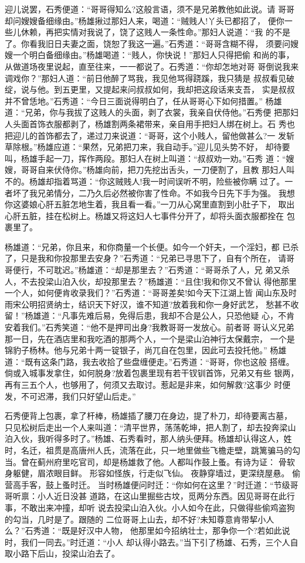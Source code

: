 迎儿说罢，石秀便道：“哥哥得知么?这般言语，须不是兄弟教他如此说。请
哥哥却问嫂嫂备细缘由。”杨雄揪过那妇人来，喝道：“贼贱人!丫头已都招了，
便你一些儿休赖，再把实情对我说了，饶了这贱人一条性命。”那妇人说道：“我
的不是了。你看我旧日夫妻之面，饶恕了我这一遍。”石秀道：“哥哥含糊不得，
须要问嫂嫂一个明白备细缘由。”杨雄喝道：“贱人，你快说！”那妇人只得把偷
和尚的事，从做道场夜里说起，直至往来，一一都说了。石秀道：“你却怎地对哥
哥倒说我来调戏你？”那妇人道：“前日他醉了骂我，我见他骂得跷蹊，我只猜是
叔叔看见破绽，说与他。到五更里，又提起来问叔叔如何，我却把这段话来支吾，
实是叔叔并不曾恁地。”石秀道：“今日三面说得明白了，任从哥哥心下如何措置。”
杨雄道：“兄弟，你与我拔了这贱人的头面，剥了衣裳，我亲自伏侍他。”石秀便
把那妇人头面首饰衣服都剥了，杨雄割两条裙带来，亲自用手把妇人绑在树上。石
秀也把迎儿的首饰都去了，递过刀来说道：“哥哥，这个小贱人，留他做甚么?一
发斩草除根。”杨雄应道：“果然，兄弟把刀来，我自动手。”迎儿见头势不好，
却待要叫，杨雄手起一刀，挥作两段。那妇人在树上叫道：“叔叔劝一劝。”石秀
道：“嫂嫂，哥哥自来伏侍你。”杨雄向前，把刀先挖出舌头，一刀便割了，且教
那妇人叫不的。杨雄却指着骂道：“你这贼贱人!我一时间误听不明，险些被你瞒
过了。一者坏了我兄弟情分，二乃久后必然被你害了性命。不如我今日先下手为强。
我想你这婆娘心肝五脏怎地生着，我且看一看。”一刀从心窝里直割到小肚子下，
取出心肝五脏，挂在松树上。杨雄又将这妇人七事件分开了，却将头面衣服都拴在
包裹里了。

杨雄道：“兄弟，你且来，和你商量一个长便。如今一个奸夫，一个淫妇，都
已杀了，只是我和你投那里去安身？”石秀道：“兄弟已寻思下了，自有个所在，
请哥哥便行，不可耽迟。”杨雄道：“却是那里去？”石秀道：“哥哥杀了人，兄
弟又杀人，不去投梁山泊入伙，却投那里去？”杨雄道：“且住!我和你又不曾认
得他那里一个人，如何便肯收录我们？”石秀道：“哥哥差矣!如今天下江湖上皆
闻山东及时雨宋公明招贤纳士，结识天下好汉，谁不知道?放着我和你一身好武艺，
愁甚不收留！”杨雄道：“凡事先难后易，免得后患，我却不合是公人，只恐他疑
心，不肯安着我们。”石秀笑道：“他不是押司出身?我教哥哥一发放心。前者哥
哥认义兄弟那一日，先在酒店里和我吃酒的那两个人，一个是梁山泊神行太保戴宗，
一个是锦豹子杨林。他与兄弟十两一锭银子，尚兀自在包里，因此可去投托他。”
杨雄道：“既有这条门路，我去收拾了些盘缠便走。”石秀道：“哥哥，你也这般
搭缠。倘或入城事发拿住，如何脱身?放着包裹里现有若干钗钏首饰，兄弟又有些
银两，再有三五个人，也够用了，何须又去取讨。惹起是非来，如何解救?这事少
时便发，不可迟滞，我们只好望山后走。”

石秀便背上包裹，拿了杆棒，杨雄插了腰刀在身边，提了朴刀，却待要离古墓，
只见松树后走出一个人来叫道：“清平世界，荡荡乾坤，把人割了，却去投奔梁山
泊入伙，我听得多时了。”杨雄、石秀看时，那人纳头便拜。杨雄却认得这人，姓
时，名迁，祖贯是高唐州人氏，流落在此，只一地里做些飞檐走壁，跳篱骗马的勾
当。曾在蓟州府里吃官司，却是杨雄救了他。人都叫作鼓上蚤。有诗为证：
骨软身躯健，眉浓眼目鲜。
形容如怪族，行走似飞仙。
夜静穿墙过，更深绕屋悬。
偷营高手客，鼓上蚤时迁。
当时杨雄便问时迁：“你如何在这里？”时迁道：“节级哥哥听禀：小人近日没甚
道路，在这山里掘些古坟，觅两分东西。因见哥哥在此行事，不敢出来冲撞，却听
说去投梁山泊入伙。小人如今在此，只做得些偷鸡盗狗的勾当，几时是了。跟随的
二位哥哥上山去，却不好?未知尊意肯带挈小人么？”石秀道：“既是好汉中人物，
他那里如今招纳壮士，那争你一个?若如此说时，我们一同去。”时迁道：“小人
却认得小路去。”当下引了杨雄、石秀，三个人自取小路下后山，投梁山泊去了。

